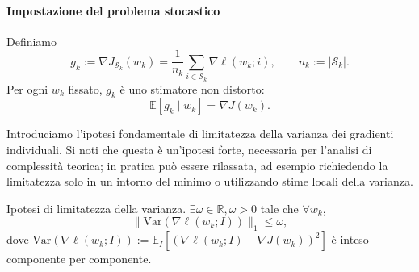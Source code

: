 \documentclass[italian, a4paper, twoside, binding=6mm]{sapthesis}
\begin{document}
\paragraph{Impostazione del problema stocastico}

Definiamo
\[
g_k := \nabla J_{\mathcal{S}_k}(w_k) = \frac{1}{n_k}\sum_{i\in \mathcal{S}_k}\nabla \ell(w_k;i), \qquad n_k := |\mathcal{S}_k|. \tag{5.2}
\]
Per ogni \(w_k\) fissato, \(g_k\) è uno stimatore non distorto:
\[
\mathbb{E}[g_k \mid w_k] = \nabla J(w_k). \tag{5.3}
\]

Introduciamo l'ipotesi fondamentale di limitatezza della varianza dei gradienti individuali. Si noti che questa \`e un'ipotesi forte, necessaria per l'analisi di complessit\`a teorica; in pratica pu\`o essere rilassata, ad esempio richiedendo la limitatezza solo in un intorno del minimo o utilizzando stime locali della varianza.

\begin{notebox}
  Ipotesi di limitatezza della varianza.
   \(\exists \omega \in \mathbb{R},\omega > 0\) tale che \(\forall w_k\),
  \[
  \|\mathrm{Var}(\nabla \ell(w_k;I))\|_1 \le \omega, \tag{5.4}\label{eq:var_bound}
  \]
  dove \(\mathrm{Var}(\nabla \ell(w_k;I)) := \mathbb{E}_I[(\nabla \ell(w_k;I) - \nabla J(w_k))^2]\) è inteso componente per componente.
\end{notebox}
\end{document}
